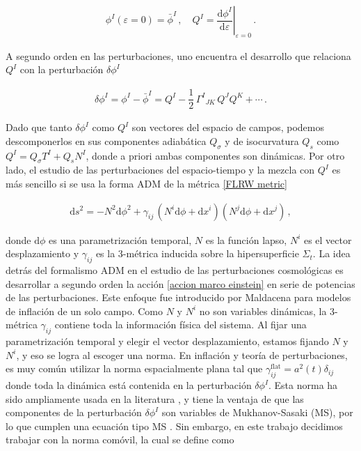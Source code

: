 \documentclass[12pt,a4paper,english,nofootinbib]{revtex4}
\newcommand{\dif}{\mathrm{d}}
\newcommand{\beq}{\begin{eqnarray}}
\newcommand{\enq}{\end{eqnarray}}
\begin{document}
\beq 
    \phi^I (\varepsilon = 0) = \bar{\phi}^I\,,\quad Q^I = \left.\dfrac{\dif \phi^I}{\dif \varepsilon}\right|_{\varepsilon = 0} \,.
    \label{IC field space}
\enq 


 A segundo orden en las perturbaciones, uno encuentra el desarrollo que relaciona $Q^I$ con la perturbación $\delta\phi^I$


\beq 
    \delta\phi^I = \phi^I-\bar{\phi}^I = Q^I - \dfrac{1}{2}\,\Gamma^I{}_{JK}\,Q^
    JQ^K  + \cdots\,.
    \label{inflationary perturbation}
\enq 

Dado que tanto $\delta\phi^I$ como $Q^I$ son vectores del espacio de campos, podemos descomponerlos en sus componentes adiabática $Q_\sigma$ y de isocurvatura $Q_s$ como $Q^I = Q_\sigma T^I+ Q_s N^I$, donde a priori ambas componentes son dinámicas. Por otro lado, el estudio de las perturbaciones del espacio-tiempo y la mezcla con $Q^I$ es más sencillo si se usa la forma ADM \cite{Arnowitt2008, Maldacena2003} de la métrica \eqref{FLRW metric}

\beq 
\dif s^2 = -N^2\dif \phi^2 + \gamma_{ij}\,(N^i\dif \phi+\dif x^i)(N^j\dif \phi + \dif x^j)\,,
\label{ADM metric}
\enq 

donde $\dif \phi$ es una parametrización temporal, $N$ es la función lapso, $N^i$ es el vector desplazamiento y $\gamma_{ij}$ es la 3-métrica inducida sobre la hipersuperficie $\Sigma_t$. La idea detrás del formalismo ADM en el estudio de las perturbaciones cosmológicas es desarrollar a segundo orden la acción \eqref{accion marco einstein} en serie de potencias de las perturbaciones. Este enfoque fue introducido por Maldacena \cite{Maldacena2003} para modelos de inflación de un solo campo. Como $N$ y $N^i$ no son variables dinámicas, la 3-métrica $\gamma_{ij}$ contiene toda la información física del sistema. Al fijar una parametrización temporal y elegir el vector desplazamiento, estamos fijando $N$ y $N^i$, y eso se logra al escoger una norma. En inflación y teoría de perturbaciones, es muy común utilizar la norma espacialmente plana tal que $\gamma_{ij}^\mathrm{flat} = a^2(t)\delta_{ij}$ donde toda la dinámica está contenida en la perturbación $\delta \phi^I$. Esta norma ha sido ampliamente usada en la literatura \cite{Sebastian2012, Bartolo2001, Wands2002, LANGLOIS2003, Langlois2008}, y tiene la ventaja de que las componentes de la perturbación $\delta\phi^I$ son variables de Mukhanov-Sasaki (MS), por lo que cumplen una ecuación tipo MS \cite{Sasaki1996, MUKHANOV1998, Wands2002, Gordon2000}. Sin embargo, en este trabajo decidimos trabajar con la norma comóvil,  la cual se define como \cite{Saenz2020, Seery2005, Lyth2005, Lyth2005a}
\end{document}
